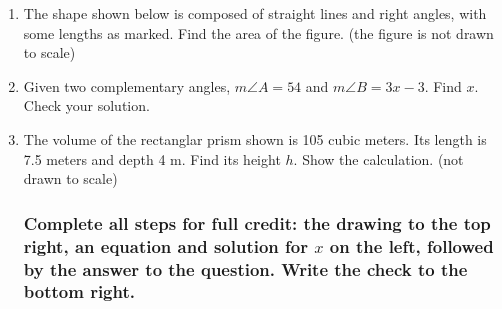 \documentclass[12pt, twoside]{article}
\begin{document}
\begin{enumerate}
  \item The shape shown below is composed of straight lines and right angles, with some lengths as marked. Find the area of the figure. (the figure is not drawn to scale)
  \begin{flushleft}
  \end{flushleft} \vspace{2cm}

  \item Given two complementary angles, $m\angle A = 54$ and $m\angle B = 3x-3$. Find $x$. Check your solution. \vspace{3.5cm} 

\item The volume of the rectanglar prism shown is 105 cubic meters. Its length is 7.5 meters and depth 4 m. Find its height $h$. Show the calculation. (not drawn to scale)
\begin{flushright}
  \end{flushright} \vspace{1cm} 

\newpage

\subsubsection*{Complete all steps for full credit: the drawing to the top right, an equation and solution for $x$ on the left, followed by the answer to the question. Write the check to the bottom right.}


\end{enumerate}
\end{document}
